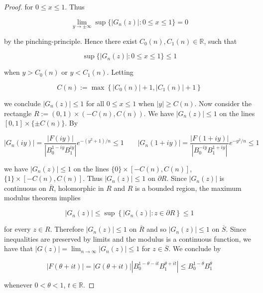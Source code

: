 \begin{proof}
\noindent for $0 \leq x \leq 1$. Thus
	
\begin{equation*}
	\lim_{y \to \pm \infty}\sup\{\left| G_n(z)\right| : 0 \leq x \leq 1\} = 0
\end{equation*}

\noindent by the pinching-principle. Hence there exist $C_0(n),C_1(n) \in \mathbb{R}$, such that 

\begin{equation*}
	\sup\{\left| G_n(z)\right| : 0 \leq x \leq 1\} \leq 1
\end{equation*}

\noindent when $y > C_0(n)$ or $y < C_1(n)$. Letting

\begin{equation*}
	C(n) := \max\left\{ \left| C_0(n)\right| + 1, \left| C_1(n) \right| + 1\right\}
\end{equation*}

\noindent we conclude $\left| G_n(z) \right| \leq 1$ for all $0 \leq x \leq 1$ when $\left| y \right| \geq C(n)$. Now consider the rectangle $R := \left(0,1\right) \times \left(-C(n),C(n)\right)$. We have $\left| G_n(z) \right| \leq 1$ on the lines $[0,1] \times \{\pm C(n)\}$. By

\begin{equation*}
	\left| G_n(iy)\right| = \frac{\left| F(iy)\right|}{\left| B_0^{1 - iy} B_1^{iy}\right|}e^{-\left( y^2 + 1 \right)/n} \leq 1 \qquad \left| G_n(1 + iy)\right| =	\frac{\left| F(1 + iy)\right|}{\left| B_0^{-iy}B_1^{1 + iy}\right|}e^{-y^2/n} \leq 1
\end{equation*}

\noindent we have $\left| G_n(z)\right| \leq 1$ on the lines $\{0\} \times [-C(n),C(n)]$, $\{1\} \times [-C(n),C(n)]$. Thus $\left| G_n(z) \right| \leq 1$ on $\partial R$. Since $\left| G_n(z)\right|$ is continuous on $\overline{R}$, holomorphic in $R$ and $R$ is a bounded region, the maximum modulus theorem implies

\begin{equation*}
	\left| G_n(z)\right| \leq \sup\left\{ \left|G_n(z) \right| : z \in \partial R \right\} \leq 1
\end{equation*}

\noindent for every $z \in R$. Therefore $\left| G_n(z) \right| \leq 1$ on $\overline{R}$ and so $\left| G_n(z) \right| \leq 1$ on $\overline{S}$. Since inequalities are preserved by limits and the modulus is a continuous function, we have that $\left| G(z) \right| = \lim_{n \to \infty} \left| G_n(z) \right| \leq 1$ for $z \in \overline{S}$. We conclude by 

\begin{equation*}
	\left| F(\theta + it) \right| = \left| G(\theta + it) \right| \left| B_0^{1 - \theta - it}B_1^{\theta + it}\right| \leq B_0^{1 - \theta} B_1^{\theta}
\end{equation*}

\noindent whenever $0 < \theta < 1$, $t \in \mathbb{R}$.
\end{proof}

